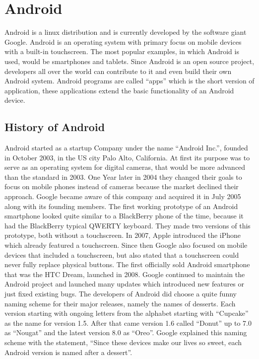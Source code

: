 \chapter{Android}
\label{ch:Android}

\author{Nico Leidenfrost}
%
Android is a linux distribution and is currently developed by the software giant Google. Android is an operating system with primary focus on mobile devices with a built-in touchscreen. The most popular examples, in which Android is used, would be smartphones and tablets. Since Android is an open source project, developers all over the world can contribute to it and even build their own Android system. Android programs are called ``apps'' which is the short version of application, these applications extend the basic functionality of an Android device.

\section{History of Android}
Android started as a startup Company under the name ``Android Inc.'', founded in October 2003, in the US city Palo Alto, California. At first its purpose was to serve as an operating system for digital cameras, that would be more advanced than the standard in 2003. One Year later in 2004 they changed their goals to focus on mobile phones instead of cameras because the market declined their approach. Google became aware of this company and acquired it in July 2005 along with its founding members. The first working prototype of an Android smartphone looked quite similar to a BlackBerry phone of the time, because it had the BlackBerry typical QWERTY keyboard. They made two versions of this prototype, both without a touchscreen. In 2007, Apple introduced the iPhone which already featured a touchscreen. Since then Google also focused on mobile devices that included a touchscreen, but also stated that a touchscreen could never fully replace physical buttons. The first officially sold Android smartphone that was the HTC Dream, launched in 2008. Google continued to maintain the Android project and launched many updates which introduced new features or just fixed existing bugs. The developers of Android did choose a quite funny naming scheme for their major releases, namely the names of desserts. Each version starting with ongoing letters from the alphabet starting with ``Cupcake'' as the name for version 1.5. After that came version 1.6 called ``Donut'' up to 7.0 as ``Nougat'' and the latest version 8.0 as ``Oreo''. Google explained this naming scheme with the statement, ``Since these devices make our lives so sweet, each Android version is named after a dessert''.

